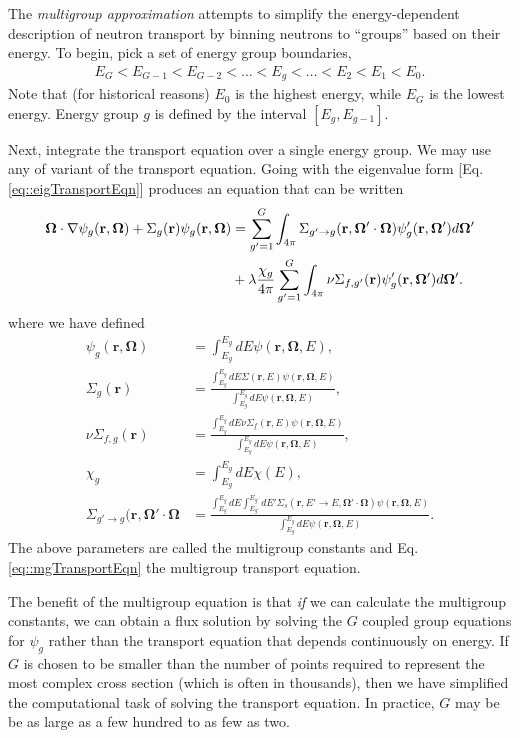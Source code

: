 \documentclass[11pt]{article}
\renewcommand\vec{\mathbf}
\begin{document}
The \emph{multigroup approximation} attempts to simplify the energy-dependent description of neutron transport by binning neutrons to ``groups'' based on their energy.  To begin, pick a set of energy group boundaries, 
\begin{align}
  E_G < E_{G-1} < E_{G-2} < \hdots < E_g < \hdots < E_2 < E_1 < E_0.
\end{align}
Note that (for historical reasons) \(E_0\) is the highest energy, while \(E_G\) is the lowest energy.  Energy group \(g\) is defined by the interval \([E_g, E_{g-1}]\).  

Next, integrate the transport equation over a single energy group.  We may use any of variant of the transport equation.  Going with the eigenvalue form [Eq. \eqref{eq::eigTransportEqn}] produces an equation that can be written
\begin{align}
  \vec{\Omega} \cdot \nabla \psi_g(\vec{r},\vec{\Omega})
  + \Sigma_g(\vec{r}) \psi_g(\vec{r},\vec{\Omega})
  &= \sum_{g'=1}^G \int_{4\pi} \Sigma_{g'\rightarrow g}(\vec{r}, \vec{\Omega}'\cdot\vec{\Omega}) \psi_g'(\vec{r},\vec{\Omega}') d\vec{\Omega}' \notag\\
  &+ \lambda\frac{\chi_g}{4\pi} \sum_{g'=1}^G \int_{4\pi} \nu\Sigma_{f,g'}(\vec{r}) \psi_g'(\vec{r},\vec{\Omega}') d\vec{\Omega}'.
  \label{eq::mgTransportEqn}
\end{align}
where we have defined
\begin{align}
  \psi_g(\vec{r},\vec{\Omega}) &= \int_{E_g}^{E_g} dE \psi(\vec{r},\vec{\Omega},E), \\
  \Sigma_g(\vec{r}) &= \frac{\int_{E_g}^{E_g} dE \Sigma(\vec{r},E) \psi(\vec{r},\vec{\Omega},E)}{\int_{E_g}^{E_g} dE \psi(\vec{r},\vec{\Omega},E)}, \\
  \nu\Sigma_{f,g}(\vec{r}) &= \frac{\int_{E_g}^{E_g} dE \nu\Sigma_f(\vec{r},E) \psi(\vec{r},\vec{\Omega},E)}{\int_{E_g}^{E_g} dE \psi(\vec{r},\vec{\Omega},E)}, \\
  \chi_g &=  \int_{E_g}^{E_g} dE \chi(E), \\
  \Sigma_{g'\rightarrow g}(\vec{r}, \vec{\Omega}'\cdot\vec{\Omega} &= 
    \frac{\int_{E_g}^{E_g} dE \int_{E_{g'}}^{E_{g'}} dE' \Sigma_s(\vec{r},E' \rightarrow E, \vec{\Omega}'\cdot\vec{\Omega}) \psi(\vec{r},\vec{\Omega},E)}{\int_{E_g}^{E_g} dE \psi(\vec{r},\vec{\Omega},E)}.
\end{align}
The above parameters are called the multigroup constants and Eq. \eqref{eq::mgTransportEqn} the multigroup transport equation.  

The benefit of the multigroup equation is that \emph{if} we can calculate the multigroup constants, we can obtain a flux solution by solving the \(G\) coupled group equations for \(\psi_g\) rather than the transport equation that depends continuously on energy.  If \(G\) is chosen to be smaller than the number of points required to represent the most complex cross section (which is often in thousands), then we have simplified the computational task of solving the transport equation.  In practice, \(G\) may be be as large as a few hundred to as few as two.
\end{document}
